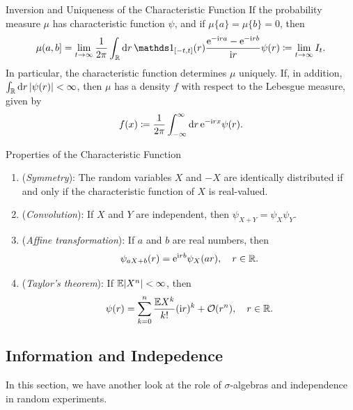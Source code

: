 \begin{thm}{Inversion and Uniqueness of the Characteristic Function}{}
	If the probability measure $\mu$ has characteristic function $\psi$, and if $\mu\{a\} = \mu\{b\} = 0$, then
	\begin{equation}
		\mu(a, b] = \lim_{t \to \infty} \frac{1}{2\pi} \int_{\R} \di r \, \I_{[-t, t]}(r) \frac{\e^{-\ii r a} - \e^{-\ii r b}}{\ii r} \psi(r) \coloneqq \lim_{t \to \infty} I_t.
		\label{eq:CharacteristicFunctionInversion}
	\end{equation}
	In particular, the characteristic function determines $\mu$ uniquely. If, in addition, $\int_{\mathbb{R}} \mathrm{d} r \, |\psi(r)| < \infty$, then $\mu$ has a density $f$ with respect to the Lebesgue measure, given by
	\begin{equation}
		f(x) \coloneqq \frac{1}{2\pi} \int_{-\infty}^{\infty} \mathrm{d} r \, \mathrm{e}^{-\mathrm{i} r x} \psi(r).
		\label{eq:CharacteristicFunctionDensity}
	\end{equation}
\end{thm}

\begin{prop}{Properties of the Characteristic Function}{}
	\begin{enumerate}
		\item (\textit{Symmetry}): The random variables $X$ and $-X$ are identically distributed if and only if the characteristic function of $X$ is real-valued.
		\item (\textit{Convolution}): If $X$ and $Y$ are independent, then $\psi_{X+Y} = \psi_X \psi_Y$.
		\item (\textit{Affine transformation}): If $a$ and $b$ are real numbers, then
		      \begin{equation*}
			      \psi_{aX+b}(r) = \mathrm{e}^{\mathrm{i} r b} \psi_X(a r), \quad r \in \mathbb{R}.
		      \end{equation*}
		\item (\textit{Taylor's theorem}): If $\mathbb{E} |X^n| < \infty$, then
		      \begin{equation*}
			      \psi(r) = \sum_{k=0}^n \frac{\mathbb{E} X^k}{k!} (\mathrm{i} r)^k + \mathcal{O}(r^n), \quad r \in \mathbb{R}.
		      \end{equation*}
	\end{enumerate}
\end{prop}

\subsection{Information and Indepedence}
In this section, we have another look at the role of $\sigma$-algebras and independence in random experiments.


